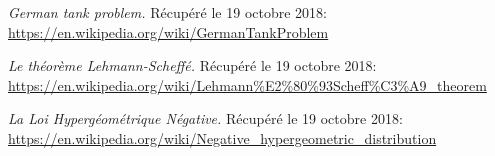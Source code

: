 \begin{thebibliography}{10}
 {\em German tank problem.} Récupéré le 19 octobre 2018:\\  \href{https://en.wikipedia.org/wiki/German_tank_problem}{https://en.wikipedia.org/wiki/GermanTankProblem}

 {\em Le théorème Lehmann-Scheffé.} Récupéré le 19 octobre 2018:\\  \href{https://en.wikipedia.org/wiki/Lehmann\%E2\%80\%93Scheff\%C3\%A9\_theorem}{https://en.wikipedia.org/wiki/Lehmann\%E2\%80\%93Scheff\%C3\%A9\_theorem}

 {\em La Loi Hypergéométrique Négative.} Récupéré le 19 octobre 2018:\\  \href{https://en.wikipedia.org/wiki/Negative\_hypergeometric\_distribution}{https://en.wikipedia.org/wiki/Negative\_hypergeometric\_distribution}

\end{thebibliography}
